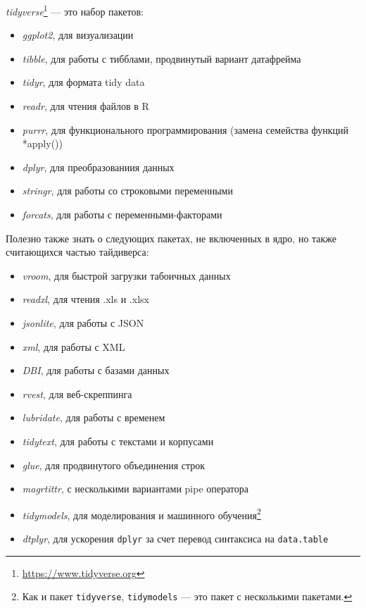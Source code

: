 \documentclass[
]{book}
\providecommand{\tightlist}{%
  \setlength{\itemsep}{0pt}\setlength{\parskip}{0pt}}
\renewcommand{\href}[2]{#2\footnote{\url{#1}}}
\begin{document}
\href{https://www.tidyverse.org}{\emph{tidyverse}} --- это набор пакетов:

\begin{itemize}
\tightlist
\item
  \emph{ggplot2}, для визуализации
\item
  \emph{tibble}, для работы с тибблами, продвинутый вариант датафрейма
\item
  \emph{tidyr}, для формата tidy data
\item
  \emph{readr}, для чтения файлов в R
\item
  \emph{purrr}, для функционального программирования (замена семейства функций *apply())
\item
  \emph{dplyr}, для преобразованиия данных
\item
  \emph{stringr}, для работы со строковыми переменными
\item
  \emph{forcats}, для работы с переменными-факторами
\end{itemize}

Полезно также знать о следующих пакетах, не включенных в ядро, но также считающихся частью тайдиверса:

\begin{itemize}
\tightlist
\item
  \emph{vroom}, для быстрой загрузки табоичных данных
\item
  \emph{readxl}, для чтения .xls и .xlsx
\item
  \emph{jsonlite}, для работы с JSON
\item
  \emph{xml}, для работы с XML
\item
  \emph{DBI}, для работы с базами данных
\item
  \emph{rvest}, для веб-скреппинга
\item
  \emph{lubridate}, для работы с временем
\item
  \emph{tidytext}, для работы с текстами и корпусами
\item
  \emph{glue}, для продвинутого объединения строк
\item
  \emph{magrtittr}, с несколькими вариантами pipe оператора
\item
  \emph{tidymodels}, для моделирования и машинного обучения\footnote{Как и пакет \texttt{tidyverse}, \texttt{tidymodels} --- это пакет с несколькими пакетами.}
\item
  \emph{dtplyr}, для ускорения \texttt{dplyr} за счет перевод синтаксиса на \texttt{data.table}
\end{itemize}
\end{document}
